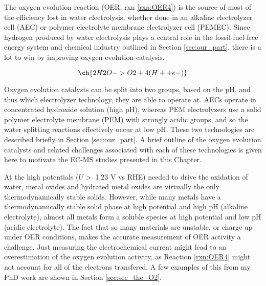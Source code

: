 

The oxygen evolution reaction (OER, rxn \ref{rxn:OER4}) is the source of most of the efficiency lost in water electrolysis\cite{Seh2017, Kibsgaard2019}, whether done in an alkaline electrolyzer cell (AEC)\cite{LeRoy1979, Dionigi2016b} or polymer electrolyte membrane electrolyzer cell (PEMEC)\cite{Carmo2013, Reier2017}. Since hydrogen produced by water electrolysis plays a central role in the fossil-fuel-free energy system and chemical industry outlined in Section \ref{sec:our_part}, there is a lot to win by improving oxygen evolution catalysis.

\begin{equation}
\ch{2 H2O -> O2 + 4 (H+ + e-)}\label{rxn:OER4}
\end{equation}

Oxygen evolution catalysts can be split into two groups, based on the pH, and thus which electrolyzer technology, they are able to operate at. AECs operate in concentrated hydroxide solution (high pH), whereas PEM electrolyzers use a solid polymer electrolyte membrane (PEM) with strongly acidic groups, and so the water splitting reactions effectively occur at low pH\cite{Carmo2013, Xiang2016}. These two technologies are described briefly in Section \ref{sec:our_part}. A brief outline of the oxygen evolution catalysts and related challenges associated with each of these technologies is given here to motivate the EC-MS studies presented in this Chapter.

At the high potentials ($U>$ 1.23 V vs RHE) needed to drive the oxidation of water, metal oxides and hydrated metal oxides are virtually the only thermodynamically stable solids\cite{Pourbaix1966}. However, while many metals have a thermodynamically stable solid phase at high potential and high pH (alkaline electrolyte), almost all metals form a soluble species at high potential and low pH (acidic electrolyte). The fact that so many materials are unstable, or charge up under OER conditions, makes the accurate measurement of OER activity a challenge. Just measuring the electrochemical current might lead to an overestimation of the oxygen evolution activity, as Reaction \ref{rxn:OER4} might not account for all of the electrons transfered. A few examples of this from my PhD work are shown in Section \ref{sec:see_the_O2}.

